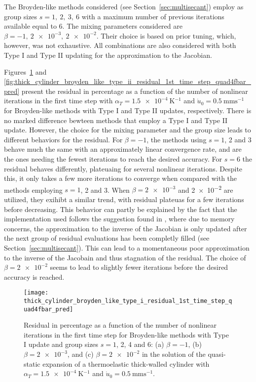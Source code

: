 The Broyden-like methods considered (see Section~\ref{sec:multisecant}) employ as group sizes \(s=1,\ 2,\ 3,\ 6\) with a maximum number of previous iterations available equal to 6.
The mixing parameters considered are \(\beta=-1,\ \num{2e-3},\ \num{2e-2}\).
Their choice is based on prior tuning, which, however, was not exhaustive.
All combinations are also considered with both Type I and Type II updating for the approximation to the Jacobian.

Figures~\ref{fig:thick_cylinder_broyden_like_type_i_residual_1st_time_step_quad4fbar_pred} and \ref{fig:thick_cylinder_broyden_like_type_ii_residual_1st_time_step_quad4fbar_pred} present the residual in percentage as a function of the number of nonlinear iterations in the first time step with \(\alpha_T=\SI{1.5e-4}{\kelvin^{-1}}\) and \(\dot u_0 =\SI{0.5}{\milli\meter\second^{-1}}\) for Broyden-like methods with Type I and Type II updates, respectively.
There is no marked difference bewteen methods that employ a Type I and Type II update.
However, the choice for the mixing parameter and the group size leads to different behaviors for the residual.
For \(\beta=-1\), the methods using \(s=1\), 2 and 3 behave much the same with an approximately linear convergence rate, and are the ones needing the fewest iterations to reach the desired accuracy.
For \(s=6\) the residual behaves differently, plateuaing for several nonlinear iterations.
Despite this, it only takes a few more iterations to converge when compared with the methods employing \(s=1\), 2 and 3.
When \(\beta=\num{2e-3}\) and \num{2e-2} are utilized, they exihibt a similar trend, with residual plateuas for a few iterations before decreasing.
This behavior can partly be explained by the fact that the implementation used follows the suggestion found in \cite{fang_two_2009}, where due to memory concerns, the approximation to the inverse of the Jacobian is only updated after the next group of residual evaluations has been completly filled (see Section~\ref{sec:multisecant}).
This can lead to a momentaneous poor approximation to the inverse of the Jacobain and thus stagnation of the residual.
The choice of \(\beta=\num{2e-2}\) seems to lead to slightly fewer iterations before the desired accuracy is reached.

\begin{figure}[htbp]
  \centering
  \texttt{[image: thick\_cylinder\_broyden\_like\_type\_i\_residual\_1st\_time\_step\_quad4fbar\_pred]}
  \caption{Residual in percentage as a function of the number of nonlinear iterations in the first time step for Broyden-like methods with Type I update and group sizes \(s=1\), 2, 4 and 6: (a) \(\beta=-1\), (b) \(\beta=\num{2e-3}\), and (c) \(\beta=\num{2e-2}\) in the solution of the quasi-static expansion of a thermoelastic thick-walled cylinder with \(\alpha_T=\SI{1.5e-4}{\kelvin^{-1}}\) and \(\dot u_0 =\SI{0.5}{\milli\meter\second^{-1}}\).}
\label{fig:thick_cylinder_broyden_like_type_i_residual_1st_time_step_quad4fbar_pred}
\end{figure}

